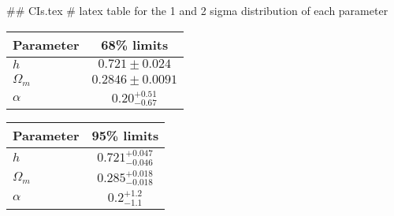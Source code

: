 ## CIs.tex
# latex table for the 1 and 2 sigma distribution of each parameter

\begin{tabular} { l  c}
 Parameter &  68\% limits\\
\hline
{\boldmath$h              $} & $0.721\pm 0.024            $\\
{\boldmath$\Omega_m       $} & $0.2846\pm 0.0091          $\\
{\boldmath$\alpha         $} & $0.20^{+0.51}_{-0.67}      $\\
\hline
\end{tabular}

\begin{tabular} { l  c}
 Parameter &  95\% limits\\
\hline
{\boldmath$h              $} & $0.721^{+0.047}_{-0.046}   $\\
{\boldmath$\Omega_m       $} & $0.285^{+0.018}_{-0.018}   $\\
{\boldmath$\alpha         $} & $0.2^{+1.2}_{-1.1}         $\\
\hline
\end{tabular}
